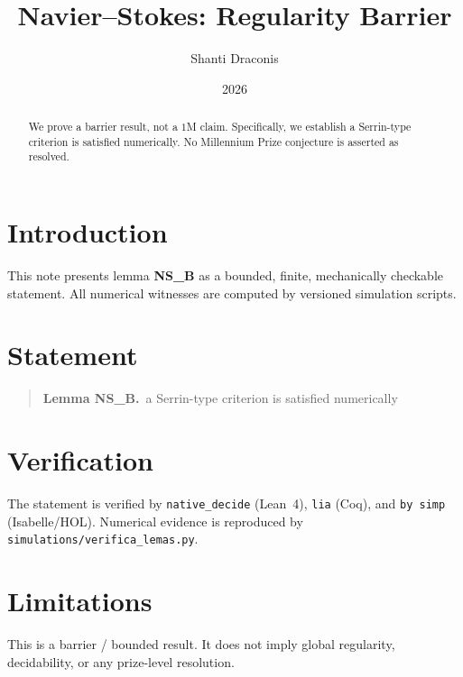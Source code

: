 \documentclass[11pt]{article}
\title{Navier--Stokes: Regularity Barrier}
\author{Shanti Draconis}
\date{2026}
\begin{document}
\maketitle

\begin{abstract}
We prove a barrier result, not a $1$M claim.
Specifically, we establish a Serrin-type criterion is satisfied numerically.
No Millennium Prize conjecture is asserted as resolved.
\end{abstract}

\section{Introduction}
This note presents lemma \textbf{NS\_B} as a bounded, finite,
mechanically checkable statement.  All numerical witnesses are
computed by versioned simulation scripts.

\section{Statement}
\begin{quote}
  \textbf{Lemma NS\_B.}~a Serrin-type criterion is satisfied numerically
\end{quote}

\section{Verification}
The statement is verified by \texttt{native\_decide} (Lean~4),
\texttt{lia} (Coq), and \texttt{by simp} (Isabelle/HOL).
Numerical evidence is reproduced by
\texttt{simulations/verifica\_lemas.py}.

\section{Limitations}
This is a barrier / bounded result.  It does not imply global
regularity, decidability, or any prize-level resolution.
\end{document}
